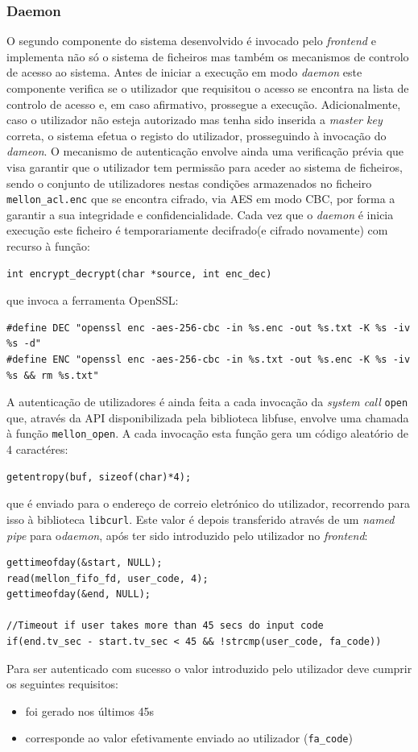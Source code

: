 \documentclass{article}
\begin{document}
\subsubsection{Daemon}
O segundo componente do sistema desenvolvido é invocado pelo \textit{frontend} e implementa não só o sistema de ficheiros mas também os mecanismos
de controlo de acesso ao sistema. 
Antes de iniciar a execução em modo \textit{daemon} este componente verifica se o utilizador que requisitou o acesso se encontra na lista de controlo
de acesso e, em caso afirmativo, prossegue a execução. Adicionalmente, caso o utilizador não esteja autorizado mas tenha sido inserida a \textit{master
key} correta, o sistema efetua o registo do utilizador, prosseguindo à invocação do \textit{dameon}.
O mecanismo de autenticação envolve ainda uma verificação prévia que visa garantir que o utilizador tem permissão para aceder ao sistema de ficheiros, 
sendo o conjunto de utilizadores nestas condições armazenados no ficheiro \texttt{mellon\_acl.enc} que se encontra cifrado, via AES em modo CBC, por 
forma a garantir a sua integridade e confidencialidade.
Cada vez que o \textit{daemon} é inicia execução este ficheiro é temporariamente decifrado(e cifrado novamente) com recurso à função:
\begin{Verbatim}
int encrypt_decrypt(char *source, int enc_dec)
\end{Verbatim}
que invoca a ferramenta OpenSSL:
\begin{Verbatim}
#define DEC "openssl enc -aes-256-cbc -in %s.enc -out %s.txt -K %s -iv %s -d"
#define ENC "openssl enc -aes-256-cbc -in %s.txt -out %s.enc -K %s -iv %s && rm %s.txt"
\end{Verbatim}

A autenticação de utilizadores é ainda feita a cada invocação da \textit{system call} \texttt{open} que, através da API disponibilizada pela biblioteca
libfuse, envolve uma chamada à função \texttt{mellon\_open}. A cada invocação esta função gera um código aleatório de 4 caractéres:
\begin{Verbatim}
getentropy(buf, sizeof(char)*4);
\end{Verbatim}
que é enviado para o endereço de correio eletrónico do utilizador, recorrendo para isso à biblioteca \texttt{libcurl}.
Este valor é depois transferido através de um \textit{named pipe} para o\textit{daemon}, após ter sido introduzido pelo utilizador 
no \textit{frontend}:
\begin{Verbatim}
gettimeofday(&start, NULL);
read(mellon_fifo_fd, user_code, 4);
gettimeofday(&end, NULL);

//Timeout if user takes more than 45 secs do input code
if(end.tv_sec - start.tv_sec < 45 && !strcmp(user_code, fa_code))
\end{Verbatim}
Para ser autenticado com sucesso o valor introduzido pelo utilizador deve cumprir os seguintes requisitos:
\begin{itemize}
    \item foi gerado nos últimos 45s
    \item corresponde ao valor efetivamente enviado ao utilizador (\texttt{fa\_code})
\end{itemize}
\end{document}
